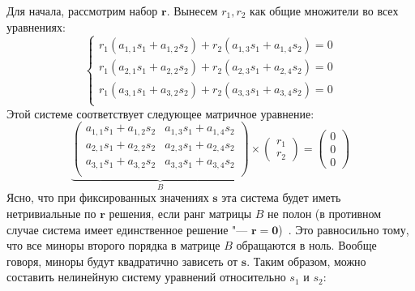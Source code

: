 Для начала, рассмотрим набор $\mathbf{r}$. Вынесем $r_1, r_2$ как общие множители во всех 
уравнениях:
\begin{equation}\label{eq:trivial_r}
	\begin{cases}
		r_1(a_{1,1} s_1 + a_{1,2} s_2) + r_2(a_{1,3} s_1 + a_{1,4} s_2) = 0 \\
		r_1(a_{2,1} s_1 + a_{2,2} s_2) + r_2(a_{2,3} s_1 + a_{2,4} s_2) = 0 \\
		r_1(a_{3,1} s_1 + a_{3,2} s_2) + r_2(a_{3,3} s_1 + a_{3,4} s_2) = 0 \\
	\end{cases}
\end{equation}
Этой системе соответствует следующее матричное уравнение:
$$
	\underbrace{
	\begin{pmatrix}
		a_{1,1} s_1 + a_{1,2} s_2 & a_{1,3} s_1 + a_{1,4} s_2 \\
		a_{2,1} s_1 + a_{2,2} s_2 & a_{2,3} s_1 + a_{2,4} s_2 \\
		a_{3,1} s_1 + a_{3,2} s_2 & a_{3,3} s_1 + a_{3,4} s_2 \\
	\end{pmatrix}}_{B}
	\times
	\begin{pmatrix}
		r_1 \\
		r_2
	\end{pmatrix}=
	\begin{pmatrix}
		0 \\
		0 \\
		0
	\end{pmatrix}
$$
Ясно, что при фиксированных значениях $\mathbf{s}$ эта система будет иметь нетривиальные по 
$\mathbf{r}$ решения, если ранг матрицы $B$ не полон (в противном случае система имеет 
единственное решение "--- $\mathbf{r} = \mathbf{0}$)~\cite{costrikin_va1}.
Это равносильно тому, что все миноры второго порядка в матрице $B$ 
обращаются в ноль. Вообще говоря, миноры будут квадратично зависеть от $\mathbf{s}$. Таким 
образом, можно составить нелинейную систему уравнений относительно $s_1$ и $s_2$: 

